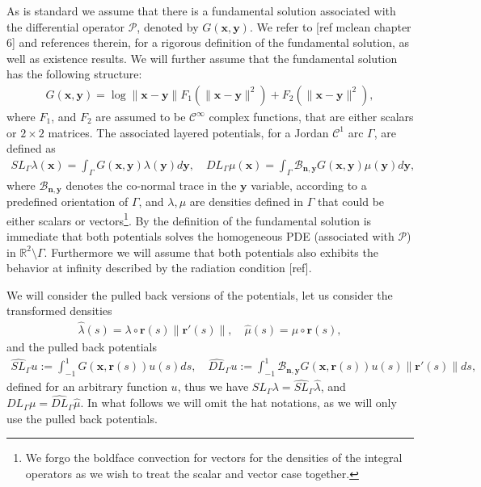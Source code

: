 \documentclass{article}
\newcommand{\vx}{\bm{x}}
\newcommand{\todo}[1]{{\color{red}[#1]}}
\newcommand{\IR}{{\mathbb R}}
\newcommand{\cP}{\mathcal{P}}
\newcommand{\bn}{\bm{n}}
\newcommand{\br}{\bm{r}}
\newcommand{\bx}{\bm{x}}
\newcommand{\by}{\bm{y}}
\begin{document}
As is standard we assume that there is a fundamental solution associated with the differential operator $\cP$, denoted by $G(\vx,\by)$. We refer to \todo{ref mclean chapter 6} and references therein, for a rigorous definition of the fundamental solution, as well as existence results. We will further assume that the fundamental solution has the following structure:
\begin{align}
\label{eq:funsolgen}
G(\bx,\by )  =
\log \|\bx -\by \| F_1(\|\bx -\by \| ^2)+F_2(\|\bx -\by \| ^2),
\end{align}
where $F_1$, and $F_2$ are assumed to be $\mathcal{C}^\infty$ complex functions, that are either scalars or $2 \times 2$ matrices. The associated layered potentials, for a Jordan $\mathcal{C}^1$ arc $\Gamma$, are defined as 
\begin{align*}
SL_\Gamma \lambda(\bx) = \int_\Gamma G(\bx,\by) \lambda(\by) d\by, \quad DL_\Gamma \mu(\bx) = \int_\Gamma \mathcal{B}_{\bn,\by} G(\bx,\by) \mu(\by) d\by,
\end{align*} 
where $\mathcal{B}_{\bn,\by}$ denotes the co-normal trace in the $\by$ variable, according to a predefined orientation of $\Gamma$, and $\lambda, \mu$ are densities defined in $\Gamma$ that could be either scalars or vectors\footnote{We forgo the boldface convection for vectors for the densities of the integral operators as we wish to treat the scalar and vector case together.}. By the definition of the fundamental solution is immediate that both potentials solves the homogeneous PDE (associated with $\cP$) in $\IR^2 \setminus \Gamma$. Furthermore we will assume that both potentials also exhibits the behavior at infinity described by the radiation condition \todo{ref}. 

We will consider the pulled back versions of the potentials, let us consider the transformed densities 
\begin{align*}
\widehat{\lambda} (s) = \lambda \circ \br(s)  \| \br'(s) \|, \quad 
\widehat{\mu} (s) = \mu \circ \br(s),
\end{align*}
and the pulled back potentials 
\begin{align*}
\widehat{SL}_{\Gamma} u := \int_{-1}^1 
 G(\bx,\br(s))  u(s) ds, \quad 
 \widehat{DL}_{\Gamma} u := \int_{-1}^1 
 \mathcal{B}_{\bn,\by}G(\bx,\br(s))  u(s) \|\br'(s)\|ds,
\end{align*}
defined for an arbitrary function $u$, thus we have $SL_\Gamma \lambda  = \widehat{SL}_\Gamma \widehat{\lambda}$, and $DL_\Gamma \mu  = \widehat{DL}_\Gamma \widehat{\mu}$. In what follows we will omit the hat notations, as we will only use the pulled back potentials. 
\end{document}

